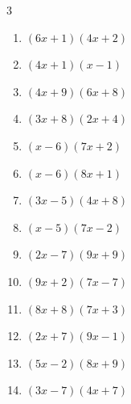 \begin{multicols}{3}
\begin{enumerate}

\columnbreak %

\resetques

  \item $(6x+1)(4x+2)$


  \item $(4x+1)(x-1)$


  \item $(4x+9)(6x+8)$


  \item $(3x+8)(2x+4)$


  \item $(x-6)(7x+2)$


  \item $(x-6)(8x+1)$


  \item $(3x-5)(4x+8)$


  \item $(x-5)(7x-2)$


  \item $(2x-7)(9x+9)$


  \item $(9x+2)(7x-7)$


  \item $(8x+8)(7x+3)$


  \item $(2x+7)(9x-1)$


  \item $(5x-2)(8x+9)$


  \item $(3x-7)(4x+7)$


\end{enumerate}
\end{multicols}
